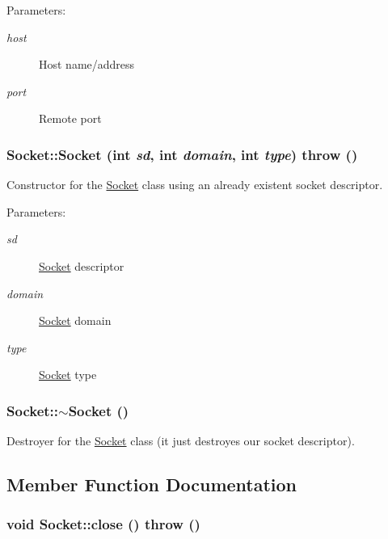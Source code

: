 \begin{Desc}
\item[Parameters:]
\begin{description}
\item[{\em host}]Host name/address \item[{\em port}]Remote port \end{description}
\end{Desc}
\hypertarget{classSocket_c95777f24c2c8e076ff6084ecb139884}{
\subsubsection[{Socket}]{\setlength{\rightskip}{0pt plus 5cm}Socket::Socket (int {\em sd}, \/  int {\em domain}, \/  int {\em type})  throw ()}}
\label{classSocket_c95777f24c2c8e076ff6084ecb139884}


Constructor for the \hyperlink{classSocket}{Socket} class using an already existent socket descriptor. 

\begin{Desc}
\item[Parameters:]
\begin{description}
\item[{\em sd}]\hyperlink{classSocket}{Socket} descriptor \item[{\em domain}]\hyperlink{classSocket}{Socket} domain \item[{\em type}]\hyperlink{classSocket}{Socket} type \end{description}
\end{Desc}
\hypertarget{classSocket_eac4eb6379a543d38ed88977d3b6630a}{
\subsubsection[{$\sim$Socket}]{\setlength{\rightskip}{0pt plus 5cm}Socket::$\sim$Socket ()}}
\label{classSocket_eac4eb6379a543d38ed88977d3b6630a}


Destroyer for the \hyperlink{classSocket}{Socket} class (it just destroyes our socket descriptor). 



\subsection{Member Function Documentation}
\hypertarget{classSocket_75ee749264ccbcfc4dfbf5442e55dcb8}{
\subsubsection[{close}]{\setlength{\rightskip}{0pt plus 5cm}void Socket::close ()  throw ()}}
\label{classSocket_75ee749264ccbcfc4dfbf5442e55dcb8}


